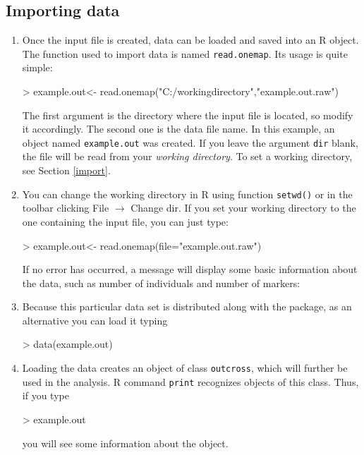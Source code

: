 \documentclass[letterpaper,12pt,oneside]{article}
\begin{document}
\subsection{Importing data}
\begin{enumerate}
\item Once the input file is created, data can be loaded and saved into an R object. The function used to import data is named {\tt read.onemap}. Its usage is quite simple:
\begin{Schunk}
\begin{Sinput}
> example.out<- read.onemap("C:/workingdirectory","example.out.raw")
\end{Sinput}
\end{Schunk}
The first argument is the directory where the input file is located, so modify it accordingly.  The second one is the data file name. In this example, an object named {\tt example.out} was created. If you leave the argument {\tt dir} blank, the file will be read from your {\it working directory}. To set a working directory, see Section \ref{import}.

\item You can change the working directory in R using function {\tt setwd()} or in the toolbar clicking File $\to$ Change dir. If you set your working directory to the one containing the input file, you can just type:
\begin{Schunk}
\begin{Sinput}
> example.out<- read.onemap(file="example.out.raw")
\end{Sinput}
\end{Schunk}

If no error has occurred, a message will display some basic information about the data, such as number of individuals and number of markers:

\item Because this particular data set is distributed along with the package, as an alternative you can load it typing
\begin{Schunk}
\begin{Sinput}
> data(example.out)
\end{Sinput}
\end{Schunk}

\item Loading the data creates an object of class {\tt outcross}, which will further be used in the analysis. R command {\tt print} recognizes objects of this class. Thus, if you type
\begin{Schunk}
\begin{Sinput}
> example.out
\end{Sinput}
\end{Schunk}

you will see some information about the object.

\end{enumerate}
\end{document}
